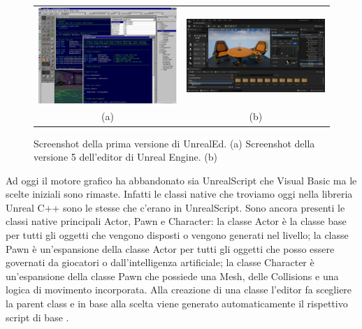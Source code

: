 \begin{figure}[h!] 
    \begin{center}
    \begin{tabular}{c @{\hspace{1em}} c}
    \includegraphics[width=6.5cm]{figure/UnrelEngineEditor1.jpg} &
    \includegraphics[width=6.5cm]{figure/01-level-editor-windows.png} \\
     (a) & (b)
    \end{tabular}
    \end{center}
    \caption{Screenshot della prima versione di UnrealEd. (a) Screenshot della versione 5 dell'editor di Unreal Engine. (b)} \label{fig:figura-doppia}
\end{figure}

Ad oggi il motore grafico ha abbandonato sia UnrealScript che Visual Basic ma le scelte iniziali sono rimaste.
%
Infatti le classi native che troviamo oggi nella libreria Unreal C++ sono le stesse che c'erano in UnrealScript.
%
Sono ancora presenti le classi native principali Actor, Pawn e Character: la classe Actor è la classe base per tutti gli oggetti che vengono disposti o vengono generati nel livello; la classe Pawn è un'espansione della classe Actor per tutti gli oggetti che posso essere governati da giocatori o dall'intelligenza artificiale; la classe Character è un'espansione della classe Pawn che possiede una Mesh, delle Collisions e una logica di movimento incorporata. 
%
Alla creazione di una classe l'editor fa scegliere la parent class e in base alla scelta viene generato automaticamente il rispettivo script di base \cite{UProgrIntro}.


